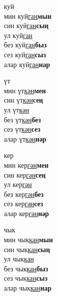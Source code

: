 \begin{multicols}{4}
\begin{enumerate}
\begin{minipage}{\linewidth}
    \item
    куй\\
    мин куй\underline{ган}\textbf{мын}\\
    син куй\underline{ган}\textbf{сың}\\
    ул куй\underline{ган}\\
    без куй\underline{ган}\textbf{быз}\\
    сез куй\underline{ган}\textbf{сыз}\\
    алар куй\underline{ган}\textbf{нар}\\
\end{minipage}

\begin{minipage}{\linewidth}
    \item
    үт\\
    мин үт\underline{кән}\textbf{мен}\\
    син үт\underline{кән}\textbf{сең}\\
    ул үт\underline{кән}\\
    без үт\underline{кән}\textbf{без}\\
    сез үт\underline{кән}\textbf{сез}\\
    алар үт\underline{кән}\textbf{нәр}\\
\end{minipage}

\begin{minipage}{\linewidth}
    \item
    кер\\
    мин кер\underline{гән}\textbf{мен}\\
    син кер\underline{гән}\textbf{сең}\\
    ул кер\underline{гән}\\
    без кер\underline{гән}\textbf{без}\\
    сез кер\underline{гән}\textbf{сез}\\
    алар кер\underline{гән}\textbf{нәр}\\
\end{minipage}

\begin{minipage}{\linewidth}
    \item
    чык\\
    мин чык\underline{кан}\textbf{мын}\\
    син чык\underline{кан}\textbf{сың}\\
    ул чык\underline{кан}\\
    без чык\underline{кан}\textbf{быз}\\
    сез чык\underline{кан}\textbf{сыз}\\
    алар чык\underline{кан}\textbf{нар}\\
\end{minipage}


\end{enumerate}
\end{multicols}
